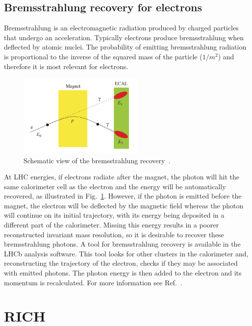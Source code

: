 \subsection{Bremsstrahlung recovery for electrons}

Bremsstrahlung is an electromagnetic radiation produced by charged particles that undergo an acceleration. 
Typically electrons produce bremsstrahlung when deflected by atomic nuclei.
The probability of emitting bremsstrahlung radiation is proportional to the inverse of the squared mass of the
particle ($1/m^2$) and therefore it is most relevant for electrons.
%
\begin{figure}[h!]
\centering
\includegraphics[width=0.55\textwidth]{RKst/figs/brem_recovery.png}
\caption{Schematic view of the bremsstrahlung recovery~\cite{Alves:2008zz}. }
\label{fig:bremreco}
\end{figure}
%
At LHC energies, if electrons radiate after the magnet, the photon will hit the same calorimeter cell
 as the electron and the energy will be automatically recovered, as illustrated in Fig.~\ref{fig:bremreco}.
However, if the photon is emitted before the magnet, the electron will be deflected by the magnetic
field whereas the photon will continue on its initial trajectory, with its energy being deposited in a different
part of the calorimeter. Missing this energy results in a poorer reconstructed invariant mass resolution, so it is
desirable to recover these bremsstrahlung photons. A tool for bremsstrahlung recovery is available
in the LHCb analysis software. This tool looks for other clusters in the calorimeter and, reconstructing the trajectory
of the electron, checks if they may be associated with emitted photons. The photon energy is then added to 
the electron and its momentum is recalculated. 
For more information see Ref.~\cite{LHCb:2003ab}.

\section{RICH}

